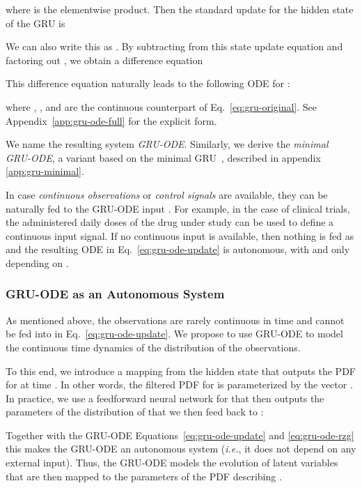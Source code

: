 \documentclass{article}
\begin{document}
where  is the elementwise product. Then the standard update for the hidden state  of the GRU is

We can also write this as . By subtracting  from this state update equation and factoring out , we obtain a difference equation

This difference equation naturally leads to the following ODE for :


where , ,  and  are the continuous counterpart of Eq.~\ref{eq:gru-original}. See Appendix~\ref{app:gru-ode-full} for the explicit form.

\iffalse
with the terms , , ,  now representing vector functions of time : 

\fi

We name the resulting system \emph{GRU-ODE}. Similarly, we derive the \emph{minimal GRU-ODE}, a variant based on the minimal GRU~\citep{zhou2016minimal}, described in appendix \ref{app:gru-minimal}.

In case \emph{continuous observations} or \emph{control signals} are available, they can be naturally fed to the GRU-ODE input . For example, in the case of clinical trials, the administered daily doses of the drug under study can be used to define a continuous input signal. If no continuous input is available, then nothing is fed as  and the resulting ODE in Eq.~\ref{eq:gru-ode-update} is autonomous, with  and  only depending on .

\iffalse
\subsubsection{GRU-ODE as an Autonomous System}
As mentioned above, the observations are rarely continuous in time and cannot be fed into  in Eq.~\ref{eq:gru-ode-update}. We propose to use GRU-ODE to model the continuous time dynamics of the distribution of the observations.


To this end, we introduce a mapping  from the hidden state that outputs the PDF for  at time . In other words, the filtered PDF for  is parameterized by the vector .
In practice, we use a feedforward neural network for  that then outputs the parameters of the distribution of  that we then feed back to :

Together with the GRU-ODE Equations~\eqref{eq:gru-ode-update} and \eqref{eq:gru-ode-rzg} this makes the GRU-ODE an autonomous system (\emph{i.e.}, it does not depend on any external input). Thus, the GRU-ODE models the evolution of latent variables  that are then mapped to the parameters  of the PDF describing .
\end{document}
